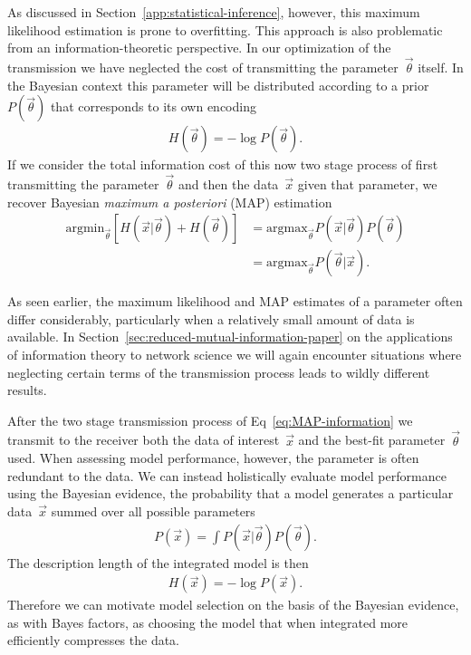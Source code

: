 As discussed in Section~\ref{app:statistical-inference}, however, this maximum likelihood estimation is prone to overfitting. This approach is also problematic from an information-theoretic perspective. In our optimization of the transmission we have neglected the cost of transmitting the parameter~$\vec{\theta}$ itself. In the Bayesian context this parameter will be distributed according to a prior~$P(\vec{\theta})$ that corresponds to its own encoding \begin{align}
    H(\vec{\theta}) = -\log P(\vec{\theta}). \label{eq:H-log-P-information}
\end{align}
If we consider the total information cost of this now two stage process of first transmitting the parameter~$\vec{\theta}$ and then the data~$\vec{x}$ given that parameter, we recover Bayesian \emph{maximum a posteriori} (MAP) estimation \begin{align}
    \text{argmin}_{\vec{\theta}} \left[H(\vec{x}|\vec{\theta}) + H(\vec{\theta})\right] &= \text{argmax}_{\vec{\theta}} P(\vec{x}|\vec{\theta})P(\vec{\theta})  \nonumber \\
    &= \text{argmax}_{\vec{\theta}} P(\vec{\theta}|\vec{x}). \label{eq:MAP-information}
\end{align}

As seen earlier, the maximum likelihood and MAP estimates of a parameter often differ considerably, particularly when a relatively small amount of data is available. In Section~\ref{sec:reduced-mutual-information-paper} on the applications of information theory to network science we will again encounter situations where neglecting certain terms of the transmission process leads to wildly different results.

After the two stage transmission process of Eq~\eqref{eq:MAP-information} we transmit to the receiver both the data of interest~$\vec{x}$ and the best-fit parameter~$\vec{\theta}$ used. When assessing model performance, however, the parameter is often redundant to the data. We can instead holistically evaluate model performance using the Bayesian evidence, the probability that a model generates a particular data~$\vec{x}$ summed over all possible parameters \begin{align}
    P(\vec{x}) = \int P(\vec{x}|\vec{\theta})P(\vec{\theta}).
\end{align} 
The description length of the integrated model is then \begin{align}
    H(\vec{x}) = -\log P(\vec{x}).
\end{align}
Therefore we can motivate model selection on the basis of the Bayesian evidence, as with Bayes factors, as choosing the model that when integrated more efficiently compresses the data.

